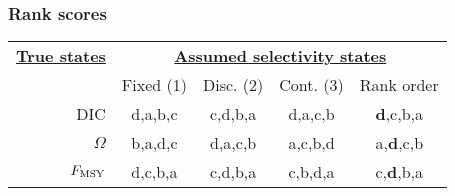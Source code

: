 \documentclass[table]{beamer}
\begin{document}
\begin{frame}[m]\frametitle{Rank scores}
    
     		\begin{tabular}{r|ccc|c}
			\hline
			\textbf{\textbf{\underline{True states}}}
			&\multicolumn{4}{c}{\textbf{\underline{Assumed selectivity states}}}\\
			&{Fixed (1)} & {Disc. (2)} & {Cont. (3)}
			&{Rank order} \\
			\hline
			 
			 DIC     & 
			 \cellcolor[gray]{1.0}	d,a,b,c           &
			 \cellcolor[gray]{1.0}	c,d,b,a           &
			 \cellcolor[gray]{1.0}	d,a,c,b           &
			 \cellcolor[gray]{1.0}	\textbf{d},c,b,a       \\
			 
			 $\Omega$  & 
			 \cellcolor[gray]{1.0}	b,a,d,c           &
			 \cellcolor[gray]{1.0}	d,a,c,b           &
			 \cellcolor[gray]{1.0}	a,c,b,d          &
			 \cellcolor[gray]{1.0}	a,\textbf{d},c,b        \\
			 
			 $F_{\rm{MSY}}$& 
			 \cellcolor[gray]{1.0}	d,c,b,a          & 
			 \cellcolor[gray]{1.0}	c,d,b,a          & 
			 \cellcolor[gray]{1.0}	c,b,d,a          & 
			 \cellcolor[gray]{1.0}	c,\textbf{d},b,a        \\
			 
			\hline

			\hline

		\end{tabular}


\end{frame}

	    
	    
	    
	    


\end{document}
